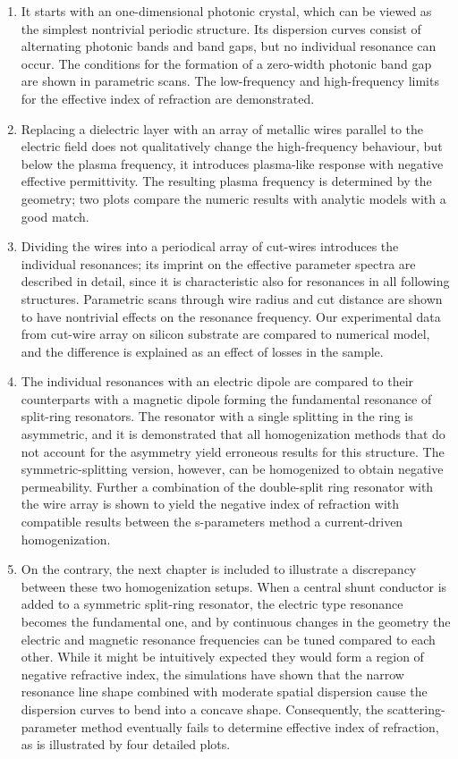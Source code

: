 \begin{enumerate}
\item{It starts with an one-dimensional photonic crystal, which can be viewed as the simplest nontrivial periodic structure. Its dispersion curves consist of alternating photonic bands and band gaps, but no individual resonance can occur. The conditions for the formation of a zero-width photonic band gap are shown in parametric scans. The low-frequency and high-frequency limits for the effective index of refraction are demonstrated.
} 
\item{Replacing a dielectric layer with an array of metallic wires parallel to the electric field does not qualitatively change the high-frequency behaviour, but below the plasma frequency, it introduces plasma-like response with negative effective permittivity. The resulting plasma frequency is determined by the geometry; two plots compare the numeric results with analytic models with a good match.
} 
\item{Dividing the wires into a periodical array of cut-wires introduces the individual resonances; its imprint on the effective parameter spectra are described in detail, since it is characteristic also for resonances in all following structures. Parametric scans through wire radius and cut distance are shown to have nontrivial effects on the resonance frequency. Our experimental data from cut-wire array on silicon substrate are compared to numerical model, and the difference is explained as an effect of losses in the sample. 
} 
\item{The individual resonances with an electric dipole are compared to their counterparts with a magnetic dipole forming the fundamental resonance of split-ring resonators. The resonator with a single splitting in the ring is asymmetric, and it is demonstrated that all homogenization methods that do not account for the asymmetry yield erroneous results for this structure. The symmetric-splitting version, however, can be homogenized to obtain negative permeability. Further a combination of the double-split ring resonator with the wire array is shown to yield the negative index of refraction with compatible results between the s-parameters method a current-driven homogenization.
} 
\item{On the contrary, the next chapter is included to illustrate a discrepancy between these two homogenization setups. When a central shunt conductor is added to a symmetric split-ring resonator, the electric type resonance becomes the fundamental one, and by continuous changes in the geometry the electric and magnetic resonance frequencies can be tuned compared to each other. While it might be intuitively expected they would form a region of negative refractive index, the simulations have shown that the narrow resonance line shape combined with moderate spatial dispersion cause the dispersion curves to bend into a concave shape. Consequently, the scattering-parameter method eventually fails to determine effective index of refraction, as is illustrated by four detailed plots.
}
\end{enumerate}
